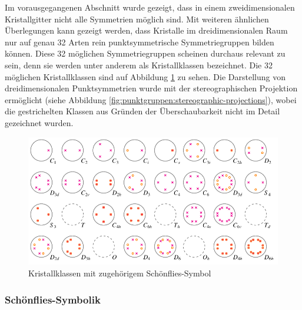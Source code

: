 Im vorausgegangenen Abschnitt wurde gezeigt, dass in einem zweidimensionalen Kristallgitter nicht alle Symmetrien möglich sind.
 Mit weiteren ähnlichen Überlegungen kann gezeigt werden, dass Kristalle im dreidimensionalen Raum nur auf genau 32 Arten rein punktsymmetrische Symmetriegruppen bilden können.
 Diese 32 möglichen Symmetriegruppen scheinen durchaus relevant zu sein, denn sie werden unter anderem als Kristallklassen bezeichnet.
 Die 32 möglichen Kristallklassen sind auf Abbildung \ref{fig:punktgruppen:Kristallkassen} zu sehen.
 Die Darstellung von dreidimensionalen Punktsymmetrien wurde mit der stereographischen Projektion ermöglicht (siehe Abbildung \ref{fig:punktgruppen:stereographic-projections}), wobei die gestrichelten Klassen aus Gründen der Überschaubarkeit nicht im Detail gezeichnet wurden.


\begin{figure}
    \centering
    \includegraphics[]{papers/punktgruppen/figures/projections}
    \caption{Kristallklassen mit zugehörigem Schönflies-Symbol}
    \label{fig:punktgruppen:Kristallkassen}
\end{figure}

\subsubsection{Schönflies-Symbolik}

